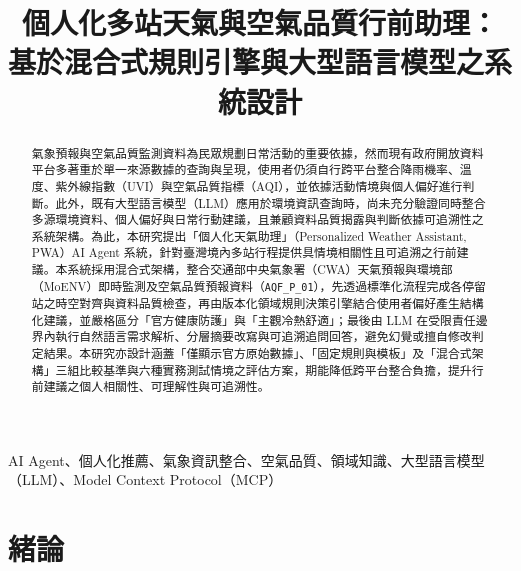 \documentclass[conference]{IEEEtran}
\begin{document}
\title{個人化多站天氣與空氣品質行前助理：\\基於混合式規則引擎與大型語言模型之系統設計}

\author{
}

\maketitle

\begin{abstract}
\mdseries 氣象預報與空氣品質監測資料為民眾規劃日常活動的重要依據，然而現有政府開放資料平台多著重於單一來源數據的查詢與呈現，使用者仍須自行跨平台整合降雨機率、溫度、紫外線指數（UVI）與空氣品質指標（AQI），並依據活動情境與個人偏好進行判斷。此外，既有大型語言模型（LLM）應用於環境資訊查詢時，尚未充分驗證同時整合多源環境資料、個人偏好與日常行動建議，且兼顧資料品質揭露與判斷依據可追溯性之系統架構。為此，本研究提出「個人化天氣助理」（Personalized Weather Assistant, PWA）AI Agent 系統，針對臺灣境內多站行程提供具情境相關性且可追溯之行前建議。本系統採用混合式架構，整合交通部中央氣象署（CWA）天氣預報與環境部（MoENV）即時監測及空氣品質預報資料（\texttt{AQF\_P\_01}），先透過標準化流程完成各停留站之時空對齊與資料品質檢查，再由版本化領域規則決策引擎結合使用者偏好產生結構化建議，並嚴格區分「官方健康防護」與「主觀冷熱舒適」；最後由 LLM 在受限責任邊界內執行自然語言需求解析、分層摘要改寫與可追溯追問回答，避免幻覺或擅自修改判定結果。本研究亦設計涵蓋「僅顯示官方原始數據」、「固定規則與模板」及「混合式架構」三組比較基準與六種實務測試情境之評估方案，期能降低跨平台整合負擔，提升行前建議之個人相關性、可理解性與可追溯性。
\end{abstract}

\begin{IEEEkeywords}
\mdseries AI Agent、個人化推薦、氣象資訊整合、空氣品質、領域知識、大型語言模型（LLM）、Model Context Protocol（MCP）
\end{IEEEkeywords}

\section{緒論}
\end{document}
